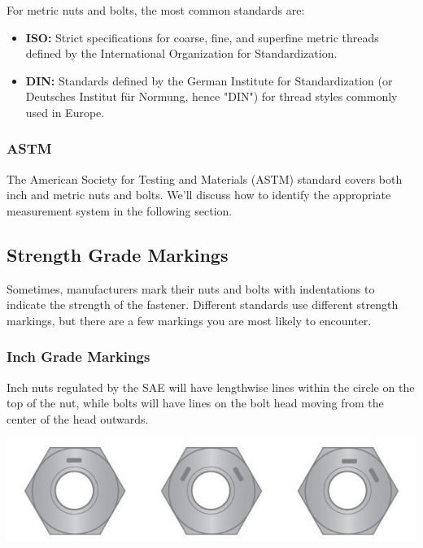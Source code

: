 \documentclass[english,]{article}
\providecommand{\tightlist}{%
  \setlength{\itemsep}{0pt}\setlength{\parskip}{0pt}}
\begin{document}
\hypertarget{iqka0h}{}
For metric nuts and bolts, the most common standards are:

\begin{itemize}
\tightlist
\item
  \textbf{ISO:} Strict specifications for coarse, fine, and superfine
  metric threads defined by the International Organization for
  Standardization.
\item
  \textbf{DIN:} Standards defined by the German Institute for
  Standardization (or Deutsches Institut für Normung, hence "DIN") for
  thread styles commonly used in Europe.
\end{itemize}

\hypertarget{iqn22v}{%
\subsubsection{ASTM}\label{iqn22v}}

\hypertarget{i8rga1s}{}
The American Society for Testing and Materials (ASTM) standard covers
both inch and metric nuts and bolts. We'll discuss how to identify the
appropriate measurement system in the following section.

\hypertarget{iaa4t5o}{%
\subsection{Strength Grade Markings}\label{iaa4t5o}}

\hypertarget{i0htiud}{}
Sometimes, manufacturers mark their nuts and bolts with indentations to
indicate the strength of the fastener. Different standards use different
strength markings, but there are a few markings you are most likely to
encounter.

\hypertarget{iw5uma}{%
\subsubsection{Inch Grade Markings}\label{iw5uma}}

\hypertarget{i7qq3fl}{}
Inch nuts regulated by the SAE will have lengthwise lines within the
circle on the top of the nut, while bolts will have lines on the bolt
head moving from the center of the head outwards.

\hypertarget{in8paa}{}
\includegraphics{Introduction to Nut and Bolt Sizes_files/6307b8d27e9fd904635918.jpg}
\end{document}
